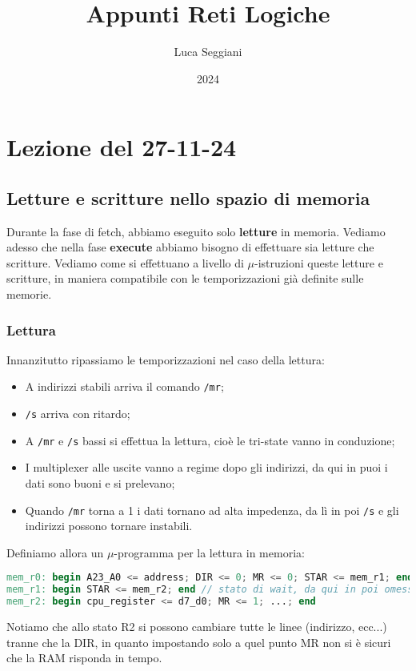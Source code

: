 \documentclass[a4paper,11pt]{article}
\title{Appunti Reti Logiche}
\author{Luca Seggiani}
\date{2024}
\begin{document}
\section{Lezione del 27-11-24}

\thispagestyle{empty}
\pagestyle{fancy}

\subsection{Letture e scritture nello spazio di memoria}
Durante la fase di fetch, abbiamo eseguito solo \textbf{letture} in memoria.
Vediamo adesso che nella fase \textbf{execute} abbiamo bisogno di effettuare sia letture che scritture.
Vediamo come si effettuano a livello di $\mu$-istruzioni queste letture e scritture, in maniera compatibile con le temporizzazioni già definite sulle memorie.

\subsubsection{Lettura}
Innanzitutto ripassiamo le temporizzazioni nel caso della lettura:
\begin{itemize}
	\item A indirizzi stabili arriva il comando \lstinline|/mr|;
	\item \lstinline|/s| arriva con ritardo;
	\item A \lstinline|/mr| e \lstinline|/s| bassi si effettua la lettura, cioè le tri-state vanno in conduzione;
	\item I multiplexer alle uscite vanno a regime dopo gli indirizzi, da qui in puoi i dati sono buoni e si prelevano;
	\item Quando \lstinline|/mr| torna a 1 i dati tornano ad alta impedenza, da lì in poi \lstinline|/s| e gli indirizzi possono tornare instabili.
\end{itemize}

Definiamo allora un $\mu$-programma per la lettura in memoria:
\begin{lstlisting}[language=verilog, style=codestyle]	
mem_r0: begin A23_A0 <= address; DIR <= 0; MR <= 0; STAR <= mem_r1; end
mem_r1: begin STAR <= mem_r2; end // stato di wait, da qui in poi omesso 
mem_r2: begin cpu_register <= d7_d0; MR <= 1; ...; end 
\end{lstlisting}
Notiamo che allo stato R2 si possono cambiare tutte le linee (indirizzo, ecc...) tranne che la DIR, in quanto impostando solo a quel punto MR non si è sicuri che la RAM risponda in tempo.
\end{document}
